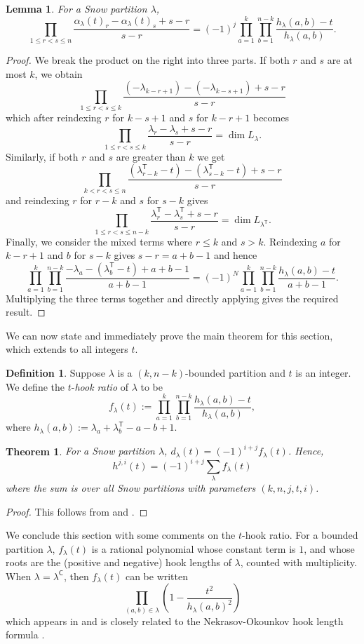 \documentclass{amsart}
\newcommand\C{\mathsf{C}}
\newcommand\T{\mathsf{T}}
\theoremstyle{plain}
\newtheorem{theorem}{Theorem}[section]
\newtheorem{lemma}[lemma]{Lemma}
\theoremstyle{definition}
\newtheorem{definition}[definition]{Definition}
\numberwithin{equation}{section}
\begin{document}
\begin{lemma}
    \label{lem: weyl product to hook product}
For a Snow partition $\lambda$,
\[\prod_{1\leq r<s\leq n}\frac{\alpha_\lambda(t)_r-\alpha_\lambda(t)_s+s-r}{s-r}=(-1)^j\prod_{a=1}^k\prod_{b=1}^{n-k}\frac{h_{\lambda}(a,b)-t}{h_{\lambda}(a,b)}.\]
\end{lemma}
\begin{proof}
We break the product on the right into three parts. If both $r$ and $s$ are at most $k$, we obtain
\[\prod_{1\leq r<s\leq k}\frac{(-\lambda_{k-r+1})-(-\lambda_{k-s+1})+s-r}{s-r}\]
which after reindexing $r$ for $k-s+1$ and $s$ for $k-r+1$ becomes
\[\prod_{1\leq r<s\leq k}\frac{\lambda_r-\lambda_s+s-r}{s-r}=\dim L_{\lambda}.\]
Similarly, if both $r$ and $s$ are greater than $k$ we get
\[\prod_{k<r<s\leq n}\frac{(\lambda_{r-k}^\T-t)-(\lambda_{s-k}^\T-t)+s-r}{s-r}\]
and reindexing $r$ for $r-k$ and $s$ for $s-k$ gives
\[\prod_{1\leq r<s\leq n-k}\frac{\lambda_r^\T-\lambda_s^\T+s-r}{s-r}=\dim L_{\lambda^\T}.\]
Finally, we consider the mixed terms where $r\leq k$ and $s>k$. Reindexing $a$ for $k-r+1$ and $b$ for $s-k$ gives $s-r=a+b-1$ and hence
\[\prod_{a=1}^k\prod_{b=1}^{n-k}\frac{-\lambda_a-(\lambda_b^\T-t)+a+b-1}{a+b-1}=(-1)^N\prod_{a=1}^k\prod_{b=1}^{n-k}\frac{h_\lambda(a,b)-t}{a+b-1}.\]
Multiplying the three terms together and directly applying  gives the required result.
\end{proof}
% 
% 
We can now state and immediately prove the main theorem for this section, which extends  to all integers $t$.

\begin{definition}\label{def:t-hook-ratio}
Suppose $\lambda$ is a $(k,n-k)$-bounded partition and $t$ is an integer. We define the $t$-\emph{hook ratio} of $\lambda$ to be
\[f_\lambda(t):=\prod_{a=1}^k\prod_{b=1}^{n-k}\frac{h_\lambda(a,b)-t}{h_\lambda(a,b)},\]
where $h_\lambda(a,b):=\lambda_a+\lambda_b^\T-a-b+1$.
\end{definition}
% 
\begin{theorem}\label{thm:dimension-formula}
For a Snow partition $\lambda$, $d_\lambda(t)=(-1)^{i+j}f_\lambda(t)$. Hence,
\[h^{j,i}(t)=(-1)^{i+j}\sum_\lambda f_\lambda(t)\]
where the sum is over all Snow partitions with parameters $(k,n,j,t,i)$.
\end{theorem}
\begin{proof}
    This follows from  and .
\end{proof}
% 
We conclude this section with some comments on the $t$-hook ratio. For a bounded partition $\lambda$, $f_\lambda(t)$ is a rational polynomial whose constant term is $1$, and whose roots are the (positive and negative) hook lengths of $\lambda$, counted with multiplicity. When $\lambda=\lambda^\C$, then $f_\lambda(t)$ can be written
\[\prod_{(a,b)\in\lambda}\left(1-\frac{t^2}{h_\lambda(a,b)^2}\right)\]
which appears in \cite[Theorem 1.1]{Han08} and is closely related to the Nekrasov-Okounkov hook length formula \cite[Theorem 6.12]{Nek06}.
\end{document}
